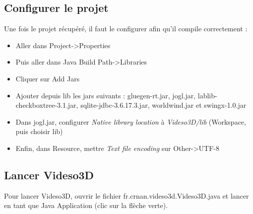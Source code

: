 \documentclass[a4paper, titlepage]{article}
\begin{document}
\subsection{Configurer le projet}
Une fois le projet récupéré, il faut le configurer afin qu'il compile
correctement :
\begin{itemize}
  \item Aller dans Project->Properties
  \item Puis aller dans Java Build Path->Libraries
  \item Cliquer sur Add Jars
  \item Ajouter depuis lib les jars suivants : gluegen-rt.jar, jogl.jar,
  lablib-checkboxtree-3.1.jar, sqlite-jdbc-3.6.17.3.jar, worldwind.jar et
  swingx-1.0.jar
  \item Dans jogl.jar, configurer \emph{Native library location} à
  \emph{Videso3D/lib} (Workspace, puis choisir lib)
  \item Enfin, dans Resource, mettre \emph{Text file encoding} sur Other->UTF-8
\end{itemize}

\subsection{Lancer Videso3D}
Pour lancer Videso3D, ouvrir le fichier fr.crnan.videso3d.Videso3D.java et
lancer en tant que Java Application (clic sur la flèche verte).
\end{document}
